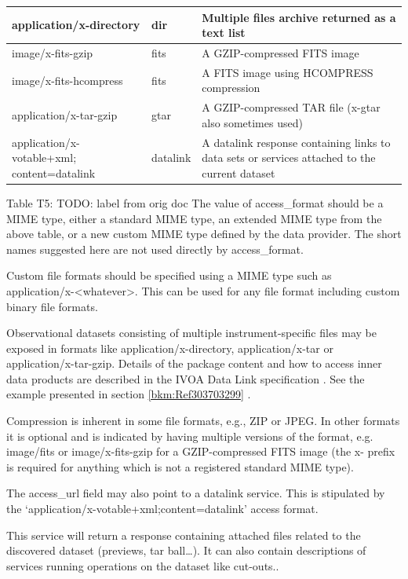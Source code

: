 \documentclass[11pt,a4paper]{ivoa}
\begin{document}
\begin{tabular}{|p{}|p{}|p{}|}
application/x-directory & dir & Multiple files archive returned as a text list \\\hline
image/x-fits-gzip & fits & A GZIP-compressed FITS image\\\hline
image/x-fits-hcompress & fits & A FITS image using HCOMPRESS compression\\\hline
application/x-tar-gzip & gtar & A GZIP-compressed TAR file (x-gtar also sometimes used)\\\hline
application/x-votable+xml; content=datalink & datalink & A datalink response containing links to  data sets or services attached to the current dataset\\\hline
\end{tabular}
\label{bkm:Ref286578377}Table T5: TODO: label from orig doc
The value of access\_format should be a MIME type, either a standard MIME type, an extended MIME type from the above
table, or a new custom MIME type defined by the data provider.  The short names suggested here are not used directly by
access\_format.

Custom file formats should be specified using a MIME type such as
{\textquotedbl}application/x-{\textless}whatever{\textgreater}{\textquotedbl}.  This can be used for any file format
including custom binary file formats.

Observational datasets consisting of multiple instrument-specific files may be exposed in formats like
application/x-directory, application/x-tar or application/x-tar-gzip.  Details of the package content and how to access
inner data products are described in the IVOA Data Link specification \citep{2015ivoa.spec.0617D}. See the example
presented in section \ref{bkm:Ref303703299} .

Compression is inherent in some file formats, e.g., ZIP or JPEG.  In other formats it is optional and is indicated by
having multiple versions of the format, e.g. image/fits or image/x-fits-gzip for a GZIP-compressed FITS image (the
{\textquotedbl}x-{\textquotedbl} prefix is required for anything which is not a registered standard MIME type).

The access\_url field may also point to a datalink service. This is stipulated by the
`application/x-votable+xml;content=datalink' access format. 

This service will return a response containing attached files related to the discovered dataset (previews, tar
ball{\dots}).  It can also contain descriptions of services running operations on the dataset like cut-outs..
\end{document}
